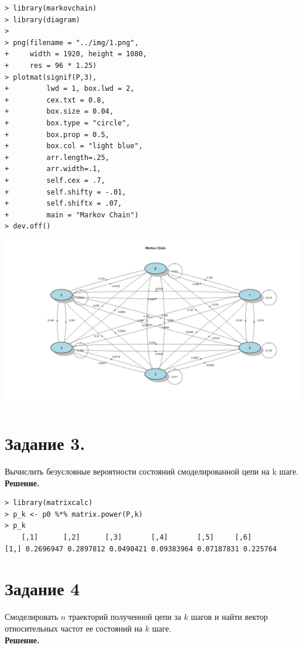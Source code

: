 \documentclass[14pt,a4paper]{scrartcl}
\begin{document}
\begin{verbatim}
> library(markovchain)
> library(diagram)
> 
> png(filename = "../img/1.png",
+     width = 1920, height = 1080,
+     res = 96 * 1.25)
> plotmat(signif(P,3), 
+         lwd = 1, box.lwd = 2, 
+         cex.txt = 0.8, 
+         box.size = 0.04, 
+         box.type = "circle", 
+         box.prop = 0.5,
+         box.col = "light blue",
+         arr.length=.25,
+         arr.width=.1,
+         self.cex = .7,
+         self.shifty = -.01,
+         self.shiftx = .07,
+         main = "Markov Chain")
> dev.off()
\end{verbatim}

\includegraphics[angle=90,origin=t, scale=0.75]{../img/1.png}

\pagebreak

\section*{Задание 3.}
Вычислить безусловные вероятности состояний смоделированной цепи на k шаге.\\
\textbf{Решение.}\\

\begin{verbatim}
> library(matrixcalc)
> p_k <- p0 %*% matrix.power(P,k)
> p_k
	[,1]      [,2]      [,3]       [,4]       [,5]     [,6]
[1,] 0.2696947 0.2897812 0.0490421 0.09383964 0.07187831 0.225764
\end{verbatim}


\section*{Задание 4}
Смоделировать $n$ траекторий полученной цепи за $k$ шагов и найти вектор относительных частот ее состояний на $k$ шаге.\\
\textbf{Решение.}\\
\end{document}
